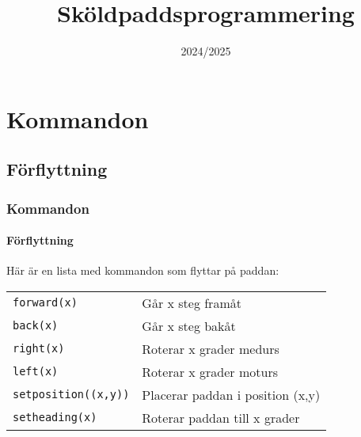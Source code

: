 \documentclass[aspectratio=169]{beamer}
\begin{document}



\title{Sköldpaddsprogrammering}
\date{2024/2025}

\maketitle

\section{Kommandon}

\subsection{Förflyttning}

\begin{frame}
	\frametitle{Kommandon}
	\framesubtitle{Förflyttning}
	
	Här är en lista med kommandon som flyttar på paddan:
	
	\begin{tabular}{ll}
		\lstinline{forward(x)} & Går x steg framåt\\
		\lstinline{back(x)} & Går x steg bakåt\\
		\lstinline{right(x)} & Roterar x grader medurs\\
		\lstinline{left(x)} & Roterar x grader moturs\\
		\lstinline{setposition((x,y))} & Placerar paddan i position (x,y)\\
		\lstinline{setheading(x)} & Roterar paddan till x grader
	\end{tabular}
	
\end{frame}
\end{document}
